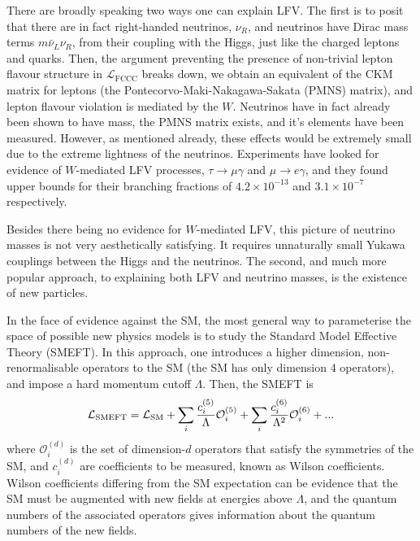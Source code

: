 There are broadly speaking two ways one can explain LFV. The first is to posit that there are in fact right-handed neutrinos, $\nu_R$, and neutrinos have Dirac mass terms $m\bar{\nu}_L\nu_R$, from their coupling with the Higgs, just like the charged leptons and quarks. Then, the argument preventing the presence of non-trivial lepton flavour structure in $\mathcal{L}_{\text{FCCC}}$ breaks down, we obtain an equivalent of the CKM matrix for leptons (the Pontecorvo-Maki-Nakagawa-Sakata (PMNS) matrix), and lepton flavour violation is mediated by the $W$. Neutrinos have in fact already been shown to have mass, the PMNS matrix exists, and it's elements have been measured. However, as mentioned already, these effects would be extremely small due to the extreme lightness of the neutrinos. Experiments have looked for evidence of $W$-mediated LFV processes, $\tau\to \mu\gamma$ and $\mu\to e\gamma$, and they found upper bounds for their branching fractions of $4.2\times 10^{-13}$ \cite{Abe:2003sx} and $3.1\times 10^{-7}$ \cite{TheMEG:2016wtm} respectively.

Besides there being no evidence for $W$-mediated LFV, this picture of neutrino masses is not very aesthetically satisfying. It requires unnaturally small Yukawa couplings between the Higgs and the neutrinos. The second, and much more popular approach, to explaining both LFV and neutrino masses, is the existence of new particles.

In the face of evidence against the SM, the most general way to parameterise the space of possible new physics models is to study the Standard Model Effective Theory (SMEFT). In this approach, one introduces a higher dimension, non-renormalisable operators to the SM (the SM has only dimension 4 operators), and impose a hard momentum cutoff $\Lambda$. Then, the SMEFT is
\begin{align}
  \mathcal{L}_{\text{SMEFT}} = \mathcal{L}_{\text{SM}} + \sum_i {c^{(5)}_i\over\Lambda} \mathcal{O}^{(5)}_i + \sum_i {c^{(6)}_i\over\Lambda^2} \mathcal{O}^{(6)}_i + ...
\end{align}
where $\mathcal{O}_i^{(d)}$ is the set of dimension-$d$ operators that satisfy the symmetries of the SM, and $c_i^{(d)}$ are coefficients to be measured, known as Wilson coefficients. Wilson coefficients differing from the SM expectation can be evidence that the SM must be augmented with new fields at energies above $\Lambda$, and the quantum numbers of the associated operators gives information about the quantum numbers of the new fields.

